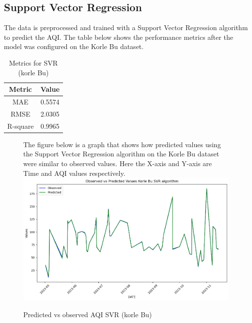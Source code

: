 \documentclass{book}
\numberwithin{equation}{section}
\numberwithin{figure}{section}
\begin{document}
\subsection{Support Vector Regression}
The data is preprocessed and trained with a Support Vector Regression algorithm to predict the AQI. The table below shows the performance metrics after the model was configured on the Korle Bu dataset.
\begin{table}[H]
    \centering
    \begin{tabular}{|c|c|}
        \hline
        \textbf{Metric} & \textbf{Value} \\
        \hline
        MAE & 0.5574 \\
        \hline
        RMSE & 2.0305 \\
        \hline
        R-square & 0.9965 \\
        \hline
    \end{tabular}
    \caption{Metrics for SVR (korle Bu)}
    \label{tab: SVR metrics(Korle Bu)}
\end{table}
\begin{figure}[H]
 \begin{minipage}{\linewidth}
        The figure below is a graph that shows how predicted values using the Support Vector Regression algorithm on the Korle Bu dataset were similar to observed values. Here the X-axis and Y-axis are Time and AQI values respectively.
        \vspace{0.5em} 
        \includegraphics[width=\linewidth]{korle bu svr.png}
       
        \caption{ Predicted vs observed AQI SVR (korle Bu)}
        \label{fig: SVR Predicted vs observed AQI(Korle Bu)}
    \end{minipage}
\end{figure}
\end{document}
